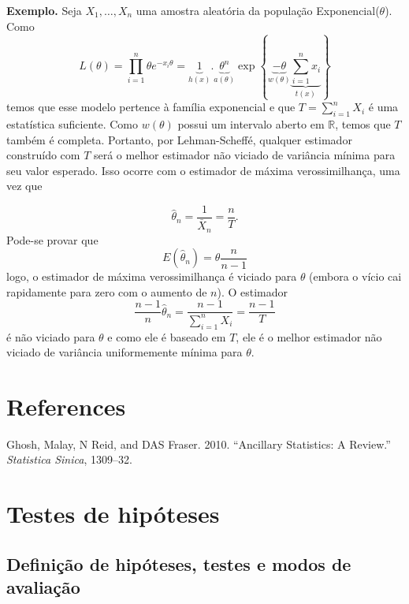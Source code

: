 \documentclass[
  letterpaper,
  DIV=11,
  numbers=noendperiod]{scrartcl}
\newlength{\cslhangindent}
\newenvironment{CSLReferences}[2] %
 {\begin{list}{}{%
  \setlength{\itemindent}{0pt}
  \setlength{\leftmargin}{0pt}
  \setlength{\parsep}{0pt}
  \ifodd #1
   \setlength{\leftmargin}{\cslhangindent}
   \setlength{\itemindent}{-1\cslhangindent}
  \fi
  \setlength{\itemsep}{#2\baselineskip}}}
 {\end{list}}
\begin{document}
\textbf{Exemplo.} Seja \(X_1,\ldots,X_n\) uma amostra aleatória da
população Exponencial(\(\theta\)). Como
\[L(\theta)=\prod_{i=1}^n \theta e^{-x_i\theta}=\underbrace{1}_{h(x)}.\underbrace{\theta^n}_{a(\theta)} \exp\left\{\underbrace{-\theta}_{w(\theta)}\underbrace{\sum_{i=1}^n x_i}_{t(x)}\right\}\]
temos que esse modelo pertence à família exponencial e que
\(T=\sum_{i=1}^nX_i\) é uma estatística suficiente. Como \(w(\theta)\)
possui um intervalo aberto em \(\mathbb{R}\), temos que \(T\) também é
completa. Portanto, por Lehman-Scheffé, qualquer estimador construído
com \(T\) será o melhor estimador não viciado de variância mínima para
seu valor esperado. Isso ocorre com o estimador de máxima
verossimilhança, uma vez que

\[\hat{\theta}_n=\frac{1}{\bar{X}_n}=\frac{n}{T}.\] Pode-se provar que
\[E(\hat{\theta}_n)=\theta\frac{n}{n-1}\] logo, o estimador de máxima
verossimilhança é viciado para \(\theta\) (embora o vício cai
rapidamente para zero com o aumento de \(n\)). O estimador
\[\frac{n-1}{n}\hat{\theta}_n=\frac{n-1}{\sum_{i=1}^n X_i}=\frac{n-1}{T}\]
é não viciado para \(\theta\) e como ele é baseado em \(T\), ele é o
melhor estimador não viciado de variância uniformemente mínima para
\(\theta\).


\chapter*{References}\label{references}


\label{refs}
\begin{CSLReferences}{1}{0}
Ghosh, Malay, N Reid, and DAS Fraser. 2010. {``Ancillary Statistics: A
Review.''} \emph{Statistica Sinica}, 1309--32.

\end{CSLReferences}


\chapter{Testes de hipóteses}\label{testes-de-hipuxf3teses}

\section{Definição de hipóteses, testes e modos de
avaliação}\label{definiuxe7uxe3o-de-hipuxf3teses-testes-e-modos-de-avaliauxe7uxe3o}
\end{document}
